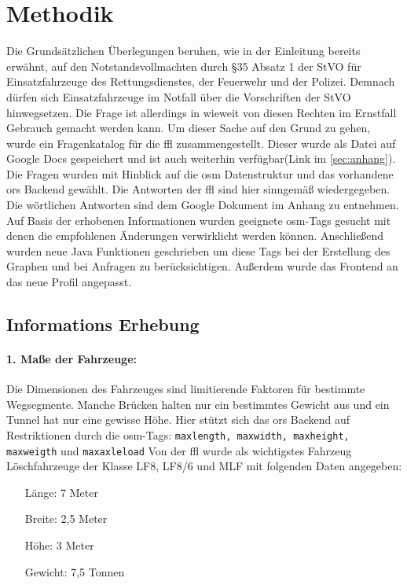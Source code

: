 \section{Methodik}
Die Grundsätzlichen Überlegungen beruhen, wie in der Einleitung bereits erwähnt, auf den Notstandsvollmachten durch §35 Absatz 1 der StVO für Einsatzfahrzeuge des Rettungsdienstes, der Feuerwehr und der Polizei.
Demnach dürfen sich Einsatzfahrzeuge im Notfall über die Vorschriften der StVO hinwegsetzen.
Die Frage ist allerdings in wieweit von diesen Rechten im Ernstfall Gebrauch gemacht werden kann.
Um dieser Sache auf den Grund zu gehen, wurde ein Fragenkatalog für die \gls{ffl} zusammengestellt.
Dieser wurde als Datei auf Google Docs gespeichert und ist auch weiterhin verfügbar(Link im \ref{sec:anhang}).
Die Fragen wurden mit Hinblick auf die \gls{osm} Datenstruktur und das vorhandene \gls{ors} Backend gewählt.
Die Antworten der \gls{ffl} sind hier sinngemäß wiedergegeben.
Die wörtlichen Antworten sind dem Google Dokument im Anhang zu entnehmen.
Auf Basis der erhobenen Informationen wurden geeignete \gls{osm}-Tags gesucht mit denen die empfohlenen Änderungen verwirklicht werden können.
Anschließend wurden neue Java Funktionen geschrieben um diese Tags bei der Erstellung des Graphen und bei Anfragen zu berücksichtigen.
Außerdem wurde das Frontend an das neue Profil angepasst.

\subsection{Informations Erhebung}

\paragraph*{1. Maße der Fahrzeuge:}
\label{frage1}
Die Dimensionen des Fahrzeuges sind limitierende Faktoren für bestimmte Wegsegmente.
Manche Brücken halten nur ein bestimmtes Gewicht aus und ein Tunnel hat nur eine gewisse Höhe.
Hier stützt sich das \gls{ors} Backend auf Restriktionen durch die \gls{osm}-Tags: \texttt{maxlength, maxwidth, maxheight, maxweigth} und \texttt{maxaxleload} Von der \gls{ffl} wurde als wichtigstes Fahrzeug Löschfahrzeuge der Klasse LF8, LF8/6 und MLF mit folgenden Daten angegeben:
\begin{itemize}
\centering
\item[Länge:] 7 Meter
\item[Breite:] 2,5 Meter
\item[Höhe:] 3 Meter
\item[Gewicht:] 7,5 Tonnen
\end{itemize}

